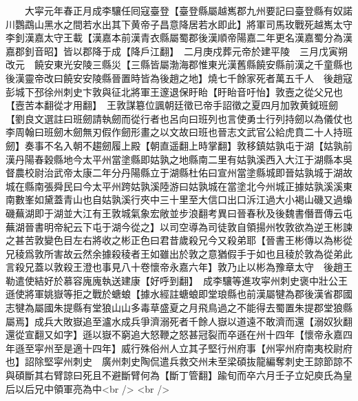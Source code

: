 　　大寜元年春正月成李驤任囘寇臺登【臺登縣屬越嶲郡九州要記曰臺登縣有奴諾川鸚鵡山黑水之間若水出其下黄帝子昌意降居若水即此】將軍司馬玫戰死越嶲太守李釗漢嘉太守王載【漢嘉本前漢青衣縣屬蜀郡後漢順帝陽嘉二年更名漢嘉蜀分為漢嘉郡釗音昭】皆以郡降于成【降戶江翻】　二月庚戍葬元帝於建平陵　三月戊寅朔改元　饒安東光安陵三縣災【三縣皆屬渤海郡惟東光漢舊縣饒安縣前漢之千童縣也後漢靈帝改曰饒安安陵縣晉置時皆為後趙之地】燒七千餘家死者萬五千人　後趙寇彭城下邳徐州刺史卞敦與征北將軍王邃退保盱眙【盱眙音吁怡】敦壼之從父兄也【壼苦本翻從才用翻】　王敦謀簒位諷朝廷徵已帝手詔徵之夏四月加敦黄鉞班劒【劉良文選註曰班劒請執劒而從行者也呂向曰班列也言使勇士行列持劒以為儀仗也李周翰曰班劒木劒無刃假作劒形畫之以文故曰班也晉志文武官公給虎賁二十人持班劒】奏事不名入朝不趨劒履上殿【朝直遥翻上時掌翻】敦移鎮姑孰屯于湖【姑孰前漢丹陽春穀縣地今太平州當塗縣即姑孰之地縣南二里有姑孰溪西入大江于湖縣本吳督農校尉治武帝太康二年分丹陽縣立于湖縣杜佑曰宣州當塗縣城即晉姑孰城于湖故城在縣南張舜民曰今太平州跨姑孰溪陸游曰姑孰城在當塗北今州城正據姑孰溪溪東南數峯如黛蓋青山也自姑孰溪行夾中三十里至大信口出口泝江過大小褐山磯又過蟂磯蕪湖即于湖並大江有王敦城氣象宏敞並步浪翻考異曰晉春秋及後魏書僭晋傳云屯蕪湖晉書明帝紀云下屯于湖今從之】以司空導為司徒敦自領揚州牧敦欲為逆王彬諫之甚苦敦變色目左右將收之彬正色曰君昔歲殺兄今又殺弟耶【晉書王彬傳以為彬從兄稜爲敦所害故云然余據殺稜者王如雖出於敦之意猶假手于如也且稜於敦為從弟此言殺兄蓋以敦殺王澄也事見八十卷懷帝永嘉六年】敦乃止以彬為豫章太守　後趙王勒遣使結好於慕容廆廆執送建康【好呼到翻】　成李驤等進攻寜州刺史褒中壯公王遜使將軍姚嶽等拒之戰於螗蜋【據水經註螗蜋即堂琅縣也前漢屬犍為郡後漢省郡國志犍為屬國朱提縣有堂狼山山多毒草盛夏之月飛鳥過之不能得去蜀置朱提郡堂狼縣屬焉】成兵大敗嶽追至瀘水成兵爭濟溺死者千餘人嶽以道遠不敢濟而還【溺奴狄翻還從宣翻又如字】遜以嶽不窮追大怒鞭之怒甚冠裂而卒遜在州十四年【懷帝永嘉四年遜至寜州至是適十四年】威行殊俗州人立其子堅行州府事【州寜州府南夷校尉府也】詔除堅寜州刺史　廣州刺史陶侃遣兵救交州未至梁碩抜龍編奪刺史王諒節諒不與碩斷其右臂諒曰死且不避斷臂何為【斷丁管翻】踰旬而卒六月壬子立妃庾氏為皇后以后兄中領軍亮為中<br />
<br />
